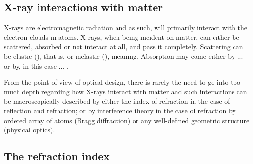 \begin{refsection}
\section{X-ray interactions with matter}\label{sec:interaction_with_matter}

X-rays are electromagnetic radiation and as such, will primarily interact with the electron clouds in atoms. X-rays, when being incident on matter, can either be scattered, absorbed or not interact at all, and pass it completely. Scattering can be elastic (), that is, or inelastic (), meaning. Absorption may come either by ... or by, in this case ... .


From the point of view of optical design, there is rarely the need to go into too much depth regarding how X-rays interact with matter and such interactions can be macroscopically described by either the index of refraction in the case of reflection and refraction; or by interference theory in the case of refraction by ordered array of atoms (Bragg diffraction) or any well-defined geometric structure (physical optics).



\subsection{The refraction index}\label{sec:refractive_index}




\end{refsection}
